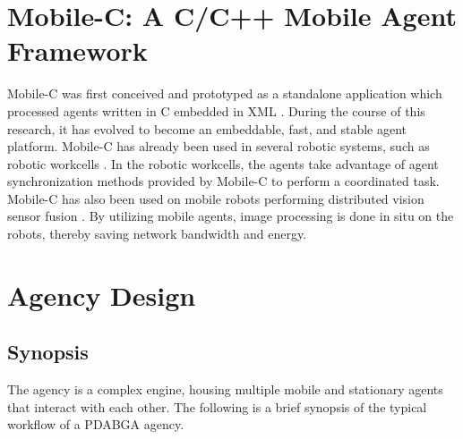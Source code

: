   \section{Mobile-C: A C/C++ Mobile Agent Framework}
    Mobile-C was first conceived and prototyped as a standalone application which
      processed agents written in C embedded in XML \cite{chen2005}. 
    During the course of this research, it has evolved to become an embeddable,
      fast, and stable agent platform. 
    Mobile-C has already been used in several robotic systems, such as robotic
      workcells \cite{Nestinge2010b}. 
    In the robotic workcells, the agents take advantage of agent
      synchronization methods provided by Mobile-C to perform a coordinated task.
    Mobile-C has also been used on mobile robots performing distributed vision
      sensor fusion \cite{Nestinge2010}. 
    By utilizing mobile agents, image processing is done in situ on the robots,
      thereby saving network bandwidth and energy.

  \section{Agency Design}
    \subsection{Synopsis}
      The agency is a complex engine, housing multiple mobile and stationary
        agents that interact with each other. 
      The following is a brief synopsis of the typical workflow of a PDABGA
        agency. 
      
